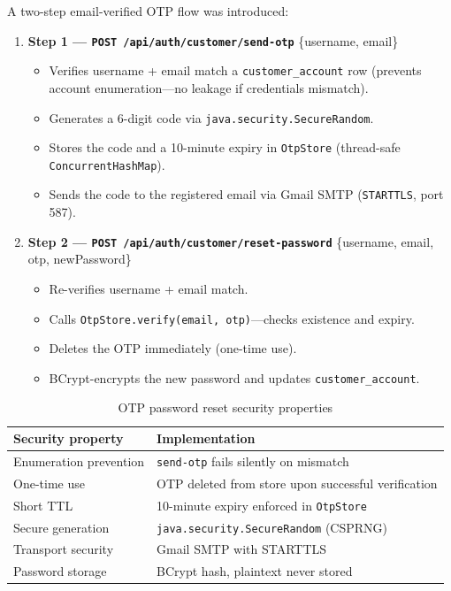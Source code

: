 \documentclass[12pt,letterpaper]{article}
\begin{document}
A two-step email-verified OTP flow was introduced:

\begin{enumerate}
  \item \textbf{Step 1 --- \texttt{POST /api/auth/customer/send-otp}} \{username, email\}
    \begin{itemize}
      \item Verifies username + email match a \texttt{customer\_account} row (prevents account enumeration---no leakage if credentials mismatch).
      \item Generates a 6-digit code via \texttt{java.security.SecureRandom}.
      \item Stores the code and a 10-minute expiry in \texttt{OtpStore} (thread-safe \texttt{ConcurrentHashMap}).
      \item Sends the code to the registered email via Gmail SMTP (\texttt{STARTTLS}, port 587).
    \end{itemize}
  \item \textbf{Step 2 --- \texttt{POST /api/auth/customer/reset-password}} \{username, email, otp, newPassword\}
    \begin{itemize}
      \item Re-verifies username + email match.
      \item Calls \texttt{OtpStore.verify(email, otp)}---checks existence and expiry.
      \item Deletes the OTP immediately (one-time use).
      \item BCrypt-encrypts the new password and updates \texttt{customer\_account}.
    \end{itemize}
\end{enumerate}

\begin{table}[H]
\centering\small
\begin{tabular}{ll}
\toprule
\textbf{Security property} & \textbf{Implementation} \\
\midrule
Enumeration prevention & \texttt{send-otp} fails silently on mismatch \\
One-time use           & OTP deleted from store upon successful verification \\
Short TTL              & 10-minute expiry enforced in \texttt{OtpStore} \\
Secure generation      & \texttt{java.security.SecureRandom} (CSPRNG) \\
Transport security     & Gmail SMTP with STARTTLS \\
Password storage       & BCrypt hash, plaintext never stored \\
\bottomrule
\end{tabular}
\caption{OTP password reset security properties}
\end{table}
\end{document}

